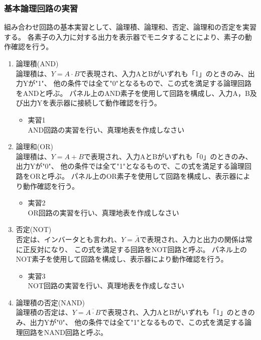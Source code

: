 \documentclass[dvipdfmx]{jsarticle}
\begin{document}
				\subsubsection{基本論理回路の実習}
					組み合わせ回路の基本実習として、論理積、論理和、否定、論理和の否定を実習する。
					各素子の入力に対する出力を表示器でモニタすることにより、素子の動作確認を行う。
					\begin{enumerate}
						\item 論理積(AND) \\
							論理積は、$Y=A \cdot B$で表現され、入力AとBがいずれも「1」のときのみ、出力Yが"1"、
							他の条件では全て"0"となるもので、この式を満足する論理回路をANDと呼ぶ。
							パネル上のAND素子を使用して回路を構成し、入力A，B及び出力Yを表示器に接続して動作確認を行う。
							\begin{itemize}
								\item 実習1 \\
									AND回路の実習を行い、真理地表を作成しなさい
							\end{itemize}
						\item 論理和(OR) \\
							論理積は、$Y=A + B$で表現され、入力AとBがいずれも「0」のときのみ、出力Yが"0"、
							他の条件では全て"1"となるもので、この式を満足する論理回路をORと呼ぶ。
							パネル上のOR素子を使用して回路を構成し、表示器により動作確認を行う。
							\begin{itemize}
								\item 実習2 \\
									OR回路の実習を行い、真理地表を作成しなさい
							\end{itemize}
						\item 否定(NOT) \\
							否定は、インバータとも言われ、$Y=\bar{A}$で表現され、入力と出力の関係は常に正反対になり、
							この式を満足する回路をNOT回路と呼ぶ。
							パネル上のNOT素子を使用して回路を構成し、表示器により動作確認を行う。
							\begin{itemize}
								\item 実習3 \\
									NOT回路の実習を行い、真理地表を作成しなさい
							\end{itemize}
						\item 論理積の否定(NAND) \\
							論理積の否定は、$Y=\overline{A \cdot B}$で表現され、入力AとBがいずれも「1」のときのみ、出力Yが"0"、
							他の条件では全て"1"となるもので、この式を満足する論理回路をNAND回路と呼ぶ。

\end{enumerate}
\end{document}
